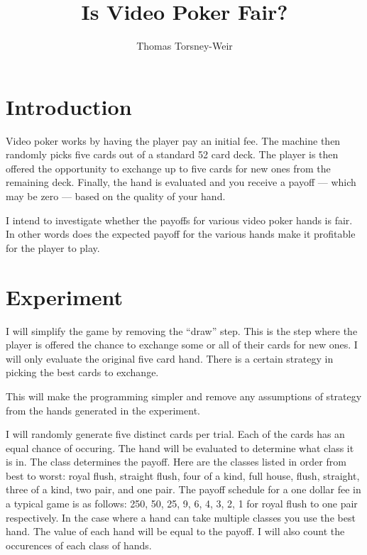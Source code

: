 \documentclass{article}
\author{Thomas Torsney-Weir}
\title{Is Video Poker Fair?}
\begin{document}
\maketitle

\section{Introduction}
Video poker works by having the player pay an initial fee.  The machine then
randomly picks five cards out of a standard 52 card deck.  The player is then 
offered the opportunity to exchange up to five cards for new ones from the
remaining deck.  Finally, the hand is evaluated and you receive a payoff 
--- which may be zero --- based on the quality of your hand.

I intend to investigate whether the payoffs for various video poker hands 
is fair.  In other words does the expected payoff for the various hands 
make it profitable for the player to play.

\section{Experiment}
I will simplify the game by removing the ``draw'' step.  This is the step
where the player is offered the chance to exchange some or all of their cards
for new ones.  I will only evaluate the original five card hand.  There is a
certain strategy in picking the best cards to exchange.  

\begin{comment}
longer explanation
You need to assume some prior probability for each class of hands given your 
current hand.  This needs to be combined with the probability of each card 
in the remaining deck, etc.
\end{comment}

This will make the programming simpler and remove any assumptions of strategy
from the hands generated in the experiment.

I will randomly generate five distinct cards per trial.  Each of the cards 
has an equal chance of occuring.  The hand will be evaluated to determine 
what class it is in.  The class determines the payoff.
Here are the classes listed in order from best to worst: royal flush, 
straight flush, four of a kind, full house, flush, straight, three of a 
kind, two pair, and one pair.  The payoff schedule for a one dollar fee in a
typical game is as follows: 250, 50, 25, 9, 6, 4, 3, 2, 1 for royal flush to
one pair respectively.  In the case where a hand can take multiple 
classes you use the best hand.  The value of each hand will be equal to 
the payoff.  I will also count the occurences of each class of hands.
\end{document}

